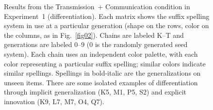\documentclass[doc,biblatex]{apa7}
\begin{document}
	\begin{figure}
	\vspace*{2pt}
	\caption{Results from the Transmission~+ Communication condition in Experiment~1 (differentiation). Each matrix shows the suffix spelling system in use at a particular generation (shape on the rows, color on the columns, as in Fig.~\ref{fig02}). Chains are labeled K--T and generations are labeled 0--9 (0 is the randomly generated seed system). Each chain uses an independent color palette, with each color representing a particular suffix spelling; similar colors indicate similar spellings. Spellings in bold-italic are the generalizations on unseen items. There are some isolated examples of differentiation through implicit generalization (K5, M1, P5, S2) and explicit innovation (K9, L7, M7, O4, Q7).}
	\label{fig05}
	\end{figure}
\end{document}
